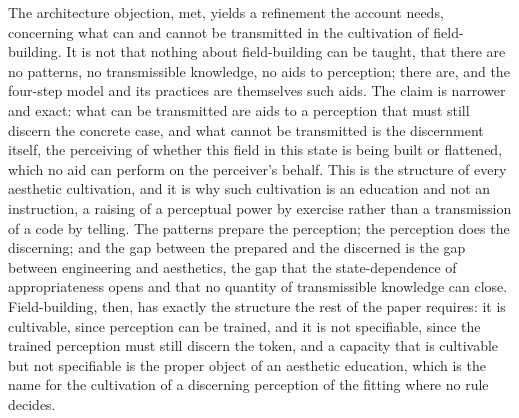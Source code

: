 The architecture objection, met, yields a refinement the account needs, concerning what can and cannot be transmitted in the cultivation of field-building. It is not that nothing about field-building can be taught, that there are no patterns, no transmissible knowledge, no aids to perception; there are, and the four-step model and its practices are themselves such aids. The claim is narrower and exact: what can be transmitted are aids to a perception that must still discern the concrete case, and what cannot be transmitted is the discernment itself, the perceiving of whether this field in this state is being built or flattened, which no aid can perform on the perceiver's behalf. This is the structure of every aesthetic cultivation, and it is why such cultivation is an education and not an instruction, a raising of a perceptual power by exercise rather than a transmission of a code by telling. The patterns prepare the perception; the perception does the discerning; and the gap between the prepared and the discerned is the gap between engineering and aesthetics, the gap that the state-dependence of appropriateness opens and that no quantity of transmissible knowledge can close. Field-building, then, has exactly the structure the rest of the paper requires: it is cultivable, since perception can be trained, and it is not specifiable, since the trained perception must still discern the token, and a capacity that is cultivable but not specifiable is the proper object of an aesthetic education, which is the name for the cultivation of a discerning perception of the fitting where no rule decides.
